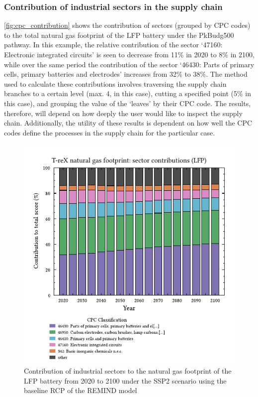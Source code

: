 \documentclass[a4paper,fleqn]{cas-dc}
\begin{document}

\subsubsection{Contribution of industrial sectors in the supply chain}\label{sec:results-case_study-topsectors}

\autoref{fig:cpc_contribution} shows the contribution of sectors (grouped by CPC codes) to the total natural gas footprint of the LFP battery under the PkBudg500 pathway. In this example, the relative contribution of the sector `47160: Electronic integrated circuits' is seen to decrease from 11\% in 2020 to 8\% in 2100, while over the same period the contribution of the sector `46430: Parts of primary cells, primary batteries and electrodes' increases from 32\% to 38\%. The method used to calculate these contributions involves traversing the supply chain branches to a certain level (max. 4, in this case), cutting a specified point (5\% in this case), and grouping the value of the `leaves' by their CPC code. The results, therefore, will depend on how deeply the user would like to inspect the supply chain. Additionally, the utility of these results is dependent on how well the CPC codes define the processes in the supply chain for the particular case.

\begin{figure}
	\centering
	\includegraphics[width=0.9\columnwidth]{figures/T-reX-wastefootprint-sectorcontributions.pdf}
	\caption{Contribution of industrial sectors to the natural gas footprint of the LFP battery from 2020 to 2100 under the SSP2 scenario using the baseline RCP of the REMIND model}\label{fig:cpc_contribution}
\end{figure}
\end{document}
